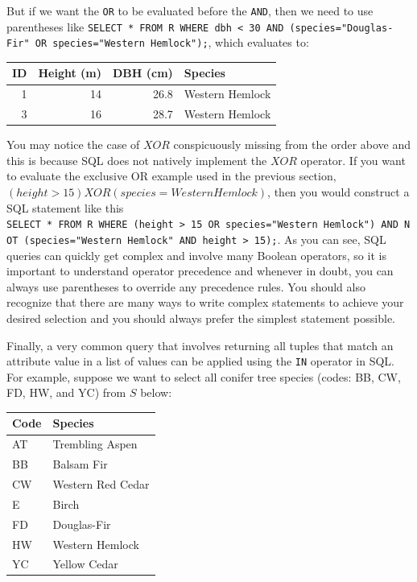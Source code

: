 \documentclass[
]{book}
\begin{document}
But if we want the \texttt{OR} to be evaluated before the \texttt{AND}, then we need to use parentheses like \texttt{SELECT\ *\ FROM\ R\ WHERE\ dbh\ \textless{}\ 30\ AND\ (species="Douglas-Fir"\ OR\ species="Western\ Hemlock");}, which evaluates to:

\begin{tabular}{rrrl}
\toprule
ID & Height (m) & DBH (cm) & Species\\
\midrule
1 & 14 & 26.8 & Western Hemlock\\
3 & 16 & 28.7 & Western Hemlock\\
\bottomrule
\end{tabular}

You may notice the case of \(XOR\) conspicuously missing from the order above and this is because SQL does not natively implement the \(XOR\) operator. If you want to evaluate the exclusive OR example used in the previous section, \((height>15)XOR(species=WesternHemlock)\), then you would construct a SQL statement like this \texttt{SELECT\ *\ FROM\ R\ WHERE\ (height\ \textgreater{}\ 15\ OR\ species="Western\ Hemlock")\ AND\ NOT\ (species="Western\ Hemlock"\ AND\ height\ \textgreater{}\ 15);}. As you can see, SQL queries can quickly get complex and involve many Boolean operators, so it is important to understand operator precedence and whenever in doubt, you can always use parentheses to override any precedence rules. You should also recognize that there are many ways to write complex statements to achieve your desired selection and you should always prefer the simplest statement possible.

Finally, a very common query that involves returning all tuples that match an attribute value in a list of values can be applied using the \texttt{IN} operator in SQL. For example, suppose we want to select all conifer tree species (codes: BB, CW, FD, HW, and YC) from \(S\) below:

\begin{tabular}{ll}
\toprule
Code & Species\\
\midrule
AT & Trembling Aspen\\
BB & Balsam Fir\\
CW & Western Red Cedar\\
E & Birch\\
FD & Douglas-Fir\\
\addlinespace
HW & Western Hemlock\\
YC & Yellow Cedar\\
\bottomrule
\end{tabular}
\end{document}
